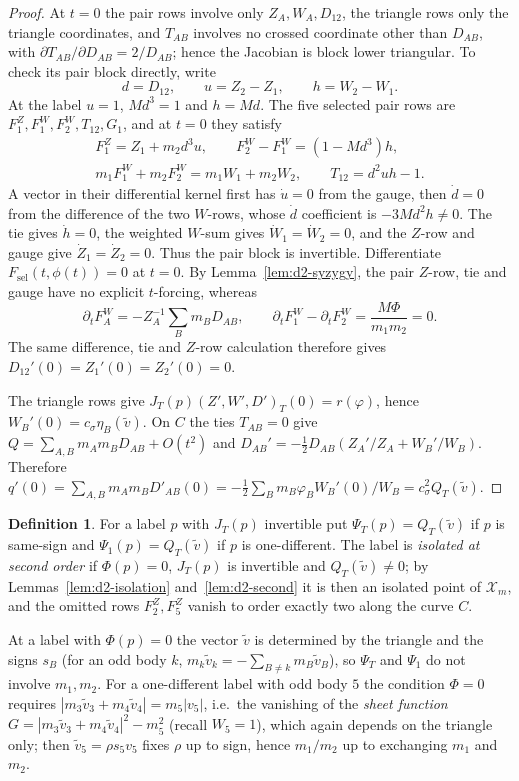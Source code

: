 \documentclass[11pt]{amsart}
\theoremstyle{definition}
\newtheorem{definition}[theorem]{Definition}
\theoremstyle{remark}
\begin{document}
\begin{proof}
{At $t=0$ the pair rows involve only $Z_A,W_A,D_{12}$, the triangle rows only the triangle
coordinates, and $T_{AB}$ involves no crossed coordinate other than $D_{AB}$, with
$\partial T_{AB}/\partial D_{AB}=2/D_{AB}$; hence the Jacobian is block lower triangular.
To check its pair block directly, write
\[
 d=D_{12},\qquad u=Z_2-Z_1,\qquad h=W_2-W_1.
\]
At the label $u=1$, $Md^3=1$ and $h=Md$. The five selected pair rows are
$F^Z_1,F^W_1,F^W_2,T_{12},G_1$, and at $t=0$ they satisfy
\[
\begin{gathered}
 F^Z_1=Z_1+m_2d^3u,\qquad F^W_2-F^W_1=(1-Md^3)h,\\
 m_1F^W_1+m_2F^W_2=m_1W_1+m_2W_2,\qquad T_{12}=d^2uh-1.
\end{gathered}
\]
A vector in their differential kernel first has $\dot u=0$ from the gauge, then
$\dot d=0$ from the difference of the two $W$-rows, whose $\dot d$ coefficient is
$-3Md^2h\ne0$. The tie gives $\dot h=0$, the weighted $W$-sum gives
$\dot W_1=\dot W_2=0$, and the $Z$-row and gauge give
$\dot Z_1=\dot Z_2=0$. Thus the pair block is invertible.
Differentiate $F_{\mathrm{sel}}(t,\phi(t))=0$ at $t=0$.
By Lemma~\ref{lem:d2-syzygy}, the pair $Z$-row, tie and gauge have no explicit
$t$-forcing, whereas
\[
 \partial_tF^W_A=-Z_A^{-1}\sum_Bm_BD_{AB},\qquad
 \partial_tF^W_1-\partial_tF^W_2=\frac{M\Phi}{m_1m_2}=0.
\]
The same difference, tie and $Z$-row calculation therefore gives
$D_{12}'(0)=Z_1'(0)=Z_2'(0)=0$.

}The triangle rows give
$J_T(p)(Z',W',D')_T(0)=r(\varphi)$, hence $W_B'(0)=c_\sigma\eta_B(\tilde v)$.  On $C$ the ties
$T_{AB}=0$ give $Q=\sum_{A,B}m_Am_BD_{AB}+O(t^2)$ and
$D_{AB}'=-\frac12D_{AB}(Z_A'/Z_A+W_B'/W_B)$.  Therefore
$q'(0)=\sum_{A,B}m_Am_BD'_{AB}(0)=-\frac12\sum_Bm_B\varphi_BW_B'(0)/W_B=c_\sigma^2Q_T(\tilde v)$.
\end{proof}

\begin{definition}\label{def:d2-psi}
For a label $p$ with $J_T(p)$ invertible put $\Psi_T(p)=Q_T(\tilde v)$ if $p$ is same-sign and
$\Psi_1(p)=Q_T(\tilde v)$ if $p$ is one-different.  The label is \emph{isolated at second order}
if $\Phi(p)=0$, $J_T(p)$ is invertible and $Q_T(\tilde v)\ne0$; by
Lemmas~\ref{lem:d2-isolation} and~\ref{lem:d2-second} it is then an isolated point of $\mathcal X_m$, and
the omitted rows $F^Z_2,F^Z_5$ vanish to order exactly two along the curve $C$.
\end{definition}

At a label with $\Phi(p)=0$ the vector $\tilde v$ is determined by the triangle and the signs
$s_B$ (for an odd body $k$, $m_k\tilde v_k=-\sum_{B\ne k}m_B\tilde v_B$), so $\Psi_T$ and
$\Psi_1$ do not involve $m_1,m_2$.  For a one-different label with odd body $5$ the condition
$\Phi=0$ requires $|m_3\tilde v_3+m_4\tilde v_4|=m_5|v_5|$, i.e.\ the vanishing of the
\emph{sheet function} $G=|m_3\tilde v_3+m_4\tilde v_4|^2-m_5^2$ (recall $W_5=1$), which again
depends on the triangle only; then $\tilde v_5=\rho s_5v_5$ fixes $\rho$ up to sign, hence
$m_1/m_2$ up to exchanging $m_1$ and $m_2$.
\end{document}
